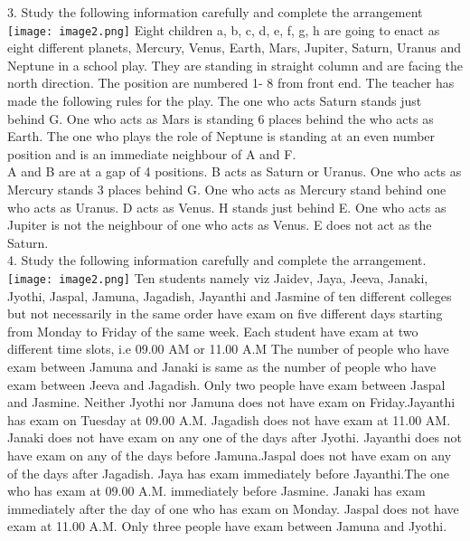 \documentclass[
]{article}
\begin{document}
3. Study the following information carefully and complete the arrangement\\
\texttt{[image: image2.png]}
Eight children a, b, c, d, e, f, g, h are going to enact as eight different planets, Mercury,
Venus, Earth, Mars, Jupiter, Saturn, Uranus and Neptune in a school play. They are
standing in straight column and are facing the north direction. The position are numbered 1-
8 from front end. The teacher has made the following rules for the play.
The one who acts Saturn stands just behind G.
One who acts as Mars is standing 6 places behind the who acts as Earth.
The one who plays the role of Neptune is standing at an even number position and is an
immediate neighbour of A and F.\\
A and B are at a gap of 4 positions.
B acts as Saturn or Uranus.
One who acts as Mercury stands 3 places behind G.
One who acts as Mercury stand behind one who acts as Uranus.
D acts as Venus.
H stands just behind E.
One who acts as Jupiter is not the neighbour of one who acts as Venus.
E does not act as the Saturn.\\

4. Study the following information carefully and complete the arrangement.\\
\texttt{[image: image2.png]}
Ten students namely viz Jaidev, Jaya, Jeeva, Janaki, Jyothi, Jaspal, Jamuna, Jagadish,
Jayanthi and Jasmine of ten different colleges but not necessarily in the same order have
exam on five different days starting from Monday to Friday of the same week. Each student
have exam at two different time slots, i.e 09.00 AM or 11.00 A.M The number of people who
have exam between Jamuna and Janaki is same as the number of people who have exam
between Jeeva and Jagadish. Only two people have exam between Jaspal and Jasmine.
Neither Jyothi nor Jamuna does not have exam on Friday.Jayanthi has exam on Tuesday at
09.00 A.M. Jagadish does not have exam at 11.00 AM. Janaki does not have exam on any one
of the days after Jyothi. Jayanthi does not have exam on any of the days before
Jamuna.Jaspal does not have exam on any of the days after Jagadish. Jaya has exam
immediately before Jayanthi.The one who has exam at 09.00 A.M. immediately before
Jasmine. Janaki has exam immediately after the day of one who has exam on Monday.
Jaspal does not have exam at 11.00 A.M. Only three people have exam between Jamuna and
Jyothi.\\
\end{document}
